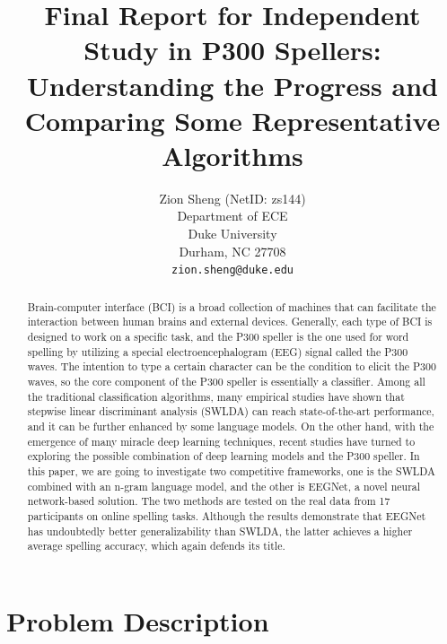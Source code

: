 \documentclass{article}
\title{Final Report for Independent Study in P300 Spellers: Understanding the Progress and Comparing Some Representative Algorithms}
\author{
	Zion Sheng (NetID: zs144)\\
	Department of ECE\\
	Duke University\\
	Durham, NC 27708 \\
	\texttt{zion.sheng@duke.edu} \\
}
\date{} %
\begin{document}
\maketitle

\vspace{-5mm}
\begin{abstract}
	Brain-computer interface (BCI) is a broad collection of machines that can facilitate the interaction between human brains and external devices. Generally, each type of BCI is designed to work on a specific task, and the P300 speller is the one used for word spelling by utilizing a special electroencephalogram (EEG) signal called the P300 waves. The intention to type a certain character can be the condition to elicit the P300 waves, so the core component of the P300 speller is essentially a classifier. Among all the traditional classification algorithms, many empirical studies have shown that stepwise linear discriminant analysis (SWLDA) can reach state-of-the-art performance, and it can be further enhanced by some language models. On the other hand, with the emergence of many miracle deep learning techniques, recent studies have turned to exploring the possible combination of deep learning models and the P300 speller. In this paper, we are going to investigate two competitive frameworks, one is the SWLDA combined with an n-gram language model, and the other is EEGNet, a novel neural network-based solution. The two methods are tested on the real data from 17 participants on online spelling tasks. Although the results demonstrate that EEGNet has undoubtedly better generalizability than SWLDA, the latter achieves a higher average spelling accuracy, which again defends its title.
\end{abstract}




\section{Problem Description} \label{Description}
\end{document}
